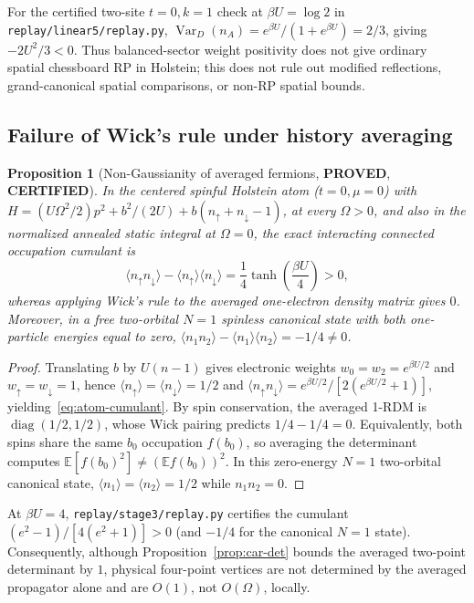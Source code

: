 \documentclass[11pt]{article}
\newtheorem{proposition}{Proposition}
\theoremstyle{remark}
\DeclareMathOperator{\Var}{Var}
\newcommand{\proved}{\textbf{PROVED}}
\newcommand{\certified}{\textbf{CERTIFIED}}
\begin{document}
For the certified two-site $t=0, k=1$ check at $\beta U=\log 2$ in \texttt{replay/linear5/replay.py}, $\Var_D(n_A)=e^{\beta U}/(1+e^{\beta U})=2/3$, giving $-2U^2/3<0$. Thus balanced-sector weight positivity does not give ordinary spatial chessboard RP in Holstein; this does not rule out modified reflections, grand-canonical spatial comparisons, or non-RP spatial bounds.

\subsection{Failure of Wick's rule under history averaging}

\begin{proposition}[Non-Gaussianity of averaged fermions, \proved, \certified]\label{prop:wick-avg}
In the centered spinful Holstein atom ($t=0,\mu=0$) with $H=(U\Omega^2/2)p^2+b^2/(2U)+b(n_\uparrow+n_\downarrow-1)$, at every $\Omega>0$, and also in the normalized annealed static integral at $\Omega=0$, the exact interacting connected occupation cumulant is
\begin{equation}\label{eq:atom-cumulant}
 \langle n_\uparrow n_\downarrow\rangle-\langle n_\uparrow\rangle\langle n_\downarrow\rangle=\frac{1}{4}\tanh\!\left(\frac{\beta U}{4}\right)>0,
\end{equation}
whereas applying Wick's rule to the averaged one-electron density matrix gives $0$. Moreover, in a free two-orbital $N=1$ spinless canonical state with both one-particle energies equal to zero, $\langle n_1 n_2\rangle-\langle n_1\rangle\langle n_2\rangle=-1/4\ne 0$.
\end{proposition}

\begin{proof}
Translating $b$ by $U(n-1)$ gives electronic weights $w_0=w_2=e^{\beta U/2}$ and $w_\uparrow=w_\downarrow=1$, hence $\langle n_\uparrow\rangle=\langle n_\downarrow\rangle=1/2$ and $\langle n_\uparrow n_\downarrow\rangle=e^{\beta U/2}/[2(e^{\beta U/2}+1)]$, yielding~\eqref{eq:atom-cumulant}. By spin conservation, the averaged 1-RDM is $\operatorname{diag}(1/2,1/2)$, whose Wick pairing predicts $1/4-1/4=0$. Equivalently, both spins share the same $b_0$ occupation $f(b_0)$, so averaging the determinant computes $\mathbb E[f(b_0)^2]\ne (\mathbb E f(b_0))^2$. In this zero-energy $N=1$ two-orbital canonical state, $\langle n_1\rangle=\langle n_2\rangle=1/2$ while $n_1 n_2=0$.
\end{proof}

At $\beta U=4$, \texttt{replay/stage3/replay.py} certifies the cumulant $(e^2-1)/[4(e^2+1)]>0$ (and $-1/4$ for the canonical $N=1$ state). Consequently, although Proposition~\ref{prop:car-det} bounds the averaged two-point determinant by $1$, physical four-point vertices are not determined by the averaged propagator alone and are $O(1)$, not $O(\Omega)$, locally.
\end{document}

